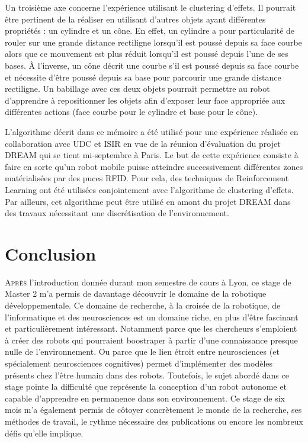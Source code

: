 \documentclass{llncs}
\begin{document}
Un troisième axe concerne l'expérience utilisant le clustering d'effets.
Il pourrait être pertinent de la réaliser en utilisant d'autres objets ayant différentes propriétés : un cylindre et un cône.
En effet, un cylindre a pour particularité de rouler sur une grande distance rectiligne lorsqu'il est poussé depuis sa face courbe alors que ce mouvement est plus réduit lorsqu'il est poussé depuis l'une de ses bases.
À l'inverse, un cône décrit une courbe s'il est poussé depuis sa face courbe et nécessite d'être poussé depuis sa base pour parcourir une grande distance rectiligne. 
Un babillage avec ces deux objets pourrait permettre au robot d'apprendre à repositionner les objets afin d'exposer leur face appropriée aux différentes actions (face courbe pour le cylindre et base pour le cône).

L'algorithme décrit dans ce mémoire a été utilisé pour une expérience réalisée en collaboration avec UDC et ISIR en vue de la réunion d'évaluation du projet DREAM qui se tient mi-septembre à Paris. 
Le but de cette expérience consiste à faire en sorte qu'un robot mobile puisse atteindre successivement différentes zones matérialisées par des puces RFID.
Pour cela, des techniques de Reinforcement Learning ont été utilisées conjointement avec l'algorithme de clustering d'effets.
Par ailleurs, cet algorithme peut être utilisé en amont du projet DREAM dans des travaux nécessitant une discrétisation de l'environnement.





\section{Conclusion}



\lettrine{A}{près} l'introduction donnée durant mon semestre de cours à Lyon, ce stage de Master 2 m'a permis de davantage découvrir le domaine de la robotique développementale.
Ce domaine de recherche, à la croisée de la robotique, de l'informatique et des neurosciences est un domaine riche, en plus d'être fascinant et particulièrement intéressant.
Notamment parce que les chercheurs s'emploient à créer des robots qui pourraient boostraper à partir d'une connaissance presque nulle de l'environnement.
Ou parce que le lien étroit entre neurosciences (et spécialement neurosciences cognitives) permet d'implémenter des modèles présents chez l'être humain dans des robots.
Toutefois, le sujet abordé dans ce stage pointe la difficulté que représente la conception d'un robot autonome et capable d'apprendre en permanence dans son environnement.
Ce stage de six mois m'a également permis de côtoyer concrètement le monde de la recherche, ses méthodes de travail, le rythme nécessaire des publications ou encore les nombreux défis qu'elle implique.
\end{document}
